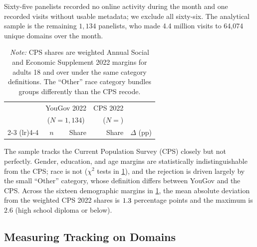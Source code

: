 \documentclass[12pt, letterpaper]{article}
\begin{document}
Sixty-five panelists recorded no online activity during the month and one recorded visits without usable metadata; we exclude all sixty-six.
The analytical sample is the remaining $1{,}134$ panelists, who made 4.4 million visits to 64,074 unique domains over the month.

\begin{table}[ht]
	\centering
	\footnotesize
	\setlength{\tabcolsep}{10pt}
	{\captionsetup{justification=centering}%
	\caption{Sample description and benchmark against the CPS}
	\label{tab:demo_summary}
	}	
	\begin{tabular}{lrrrr}
		\toprule
		& \multicolumn{2}{c}{YouGov 2022} & CPS 2022 &  \\
		& \multicolumn{2}{c}{($N = 1{,}134$)} & ($N = $) & \\
		\cmidrule(lr){2-3} \cmidrule(lr){4-4} 
		& $n$ & Share & Share & $\Delta$ (pp) \\
		\midrule
		
	\bottomrule
	\end{tabular}
	\caption*{\footnotesize \textit{Note:} CPS shares are weighted Annual Social and Economic Supplement 2022 margins for adults 18 and over under the same category definitions. The ``Other'' race category bundles groups differently than the CPS recode. }
\end{table}

The sample tracks the Current Population Survey (CPS) closely but not perfectly. Gender, education, and age margins are statistically indistinguishable from the CPS; race is not ($\chi^2$ tests in \cref{tab:demo_summary}), and the rejection is driven largely by the small ``Other'' category, whose definition differs between YouGov and the CPS. Across the sixteen demographic margins in \cref{tab:demo_summary}, the mean absolute deviation from the weighted CPS 2022 shares is $1.3$ percentage points and the maximum is $2.6$ (high school diploma or below). 

\subsection{Measuring Tracking on Domains}
\label{sec:blacklight}
 
\end{document}
